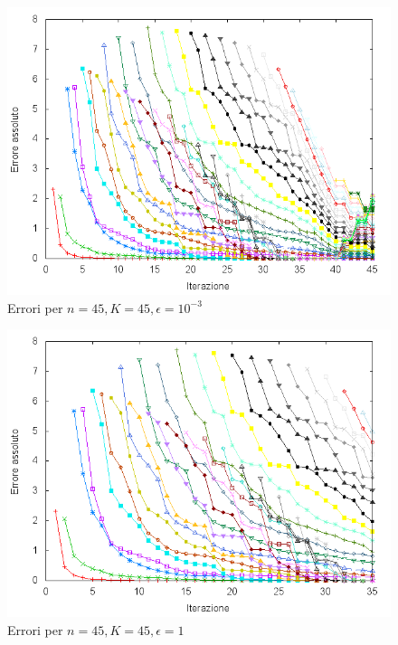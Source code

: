 \documentclass[11pt]{article}
\numberwithin{equation}{subsection}
\begin{document}
\begin{figure}[htb]
\centering
\includegraphics[width=.9\linewidth]{./img/errors_n45K45eps-3.png}
\caption{\label{epsilon_piccolo}Errori per $n=45, K=45, \epsilon=10^{-3}$}
\end{figure}

\begin{figure}[htb]
\centering
\includegraphics[width=.9\linewidth]{./img/errors_n45K45eps0.png}
\caption{\label{epsilon_grande}Errori per $n=45, K=45, \epsilon=1$}
\end{figure}
\end{document}
